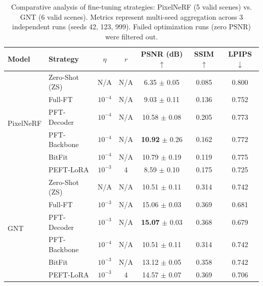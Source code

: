 \begin{table}[H]
\centering
\caption{Comparative analysis of fine-tuning strategies: PixelNeRF (5 valid scenes) vs. GNT (6 valid scenes). Metrics represent multi-seed aggregation across 3 independent runs (seeds 42, 123, 999). Failed optimization runs (zero PSNR) were filtered out.}
\label{tab:mixed_model_comparison}
\scriptsize
\begin{tabular*}{\linewidth}{@{\extracolsep{\fill}}llccccc@{\extracolsep{0pt}}}
\toprule
Model & Strategy & $\eta$ & $r$ & PSNR (dB) $\uparrow$ & SSIM $\uparrow$ & LPIPS $\downarrow$ \\
\midrule
\multirow{6}{*}{PixelNeRF}
 & Zero-Shot (ZS)   & N/A        & N/A    & 6.35 $\pm$ 0.05            & 0.085    & 0.800    \\
 & Full-FT          & $10^{-4}$  & N/A    & 9.03 $\pm$ 0.11            & 0.136    & 0.752    \\
 & PFT-Decoder      & $10^{-4}$  & N/A    & 10.58 $\pm$ 0.08           & 0.205    & 0.773    \\
 & PFT-Backbone     & $10^{-4}$  & N/A    & \textbf{10.92} $\pm$ 0.26  & 0.162    & 0.772    \\
 & BitFit           & $10^{-4}$  & N/A    & 10.79 $\pm$ 0.19           & 0.119    & 0.775    \\
 & PEFT-LoRA        & $10^{-3}$  & 4      & 8.59 $\pm$ 0.10            & 0.175    & 0.725    \\
\midrule
\multirow{6}{*}{GNT}
 & Zero-Shot (ZS)   & N/A        & N/A    & 10.51 $\pm$ 0.11           & 0.314    & 0.742    \\
 & Full-FT          & $10^{-3}$  & N/A    & 15.06 $\pm$ 0.03           & 0.369    & 0.681    \\
 & PFT-Decoder      & $10^{-3}$  & N/A    & \textbf{15.07} $\pm$ 0.03  & 0.368    & 0.679    \\
 & PFT-Backbone     & $10^{-4}$  & N/A    & 10.51 $\pm$ 0.11           & 0.314    & 0.742    \\
 & BitFit           & $10^{-3}$  & N/A    & 13.12 $\pm$ 0.05           & 0.358    & 0.742    \\
 & PEFT-LoRA        & $10^{-3}$  & 4      & 14.57 $\pm$ 0.07           & 0.369    & 0.706    \\
\bottomrule
\end{tabular*}
\end{table}
